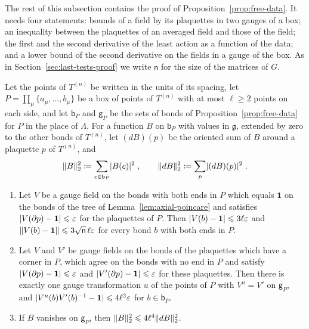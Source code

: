 \documentclass[11pt]{preprint}
\newcommand{\id}{\mathbf 1}
\DeclarePairedDelimiter{\abs}{\lvert}{\rvert}
\DeclarePairedDelimiter{\norm}{\lVert}{\rVert}
\numberwithin{equation}{section}
\begin{document}
The rest of this subsection contains the proof of Proposition~\ref{prop:free-data}. It needs four statements: bounds of a field by its plaquettes in two gauges of a box; an inequality between the plaquettes of an averaged field and those of the field; the first and the second derivative of the least action as a function of the data; and a lower bound of the second derivative on the fields in a gauge of the box. As in Section~\ref{sec:last-tests-proof} we write $\mathsf n$ for the size of the matrices of $G$.

\begin{lemma}\label{lem:box-gauges}
Let the points of $T^{(n)}$ be written in the units of its spacing, let $P = \prod_\mu\{ a_\mu, \dots, b_\mu \}$ be a box of points of $T^{(n)}$ with at most $\ell \geqslant 2$ points on each side, and let $\mathsf b_P$ and $\mathsf g_P$ be the sets of bonds of Proposition~\ref{prop:free-data} for $P$ in the place of $\Lambda$. For a function $B$ on $\mathsf b_P$ with values in $\mathfrak g$, extended by zero to the other bonds of $T^{(n)}$, let $(dB)(p)$ be the oriented sum of $B$ around a plaquette $p$ of $T^{(n)}$, and
\begin{equation}\label{eq:box-norms}
    \norm B_2^2 \coloneqq \sum_{c \in \mathsf b_P}\abs{B(c)}^2\;,
    \qquad
    \norm{dB}_2^2 \coloneqq \sum_p\abs{(dB)(p)}^2\;.
\end{equation}
\begin{enumerate}[label=(\roman*)]
\item Let $V$ be a gauge field on the bonds with both ends in $P$ which equals $\id$ on the bonds of the tree of Lemma~\ref{lem:axial-poincare} and satisfies $\abs{V(\partial p) - \id} \leqslant \varepsilon$ for the plaquettes of $P$. Then $\abs{V(b) - \id} \leqslant 3\ell\varepsilon$ and $\norm{V(b) - \id} \leqslant 3\sqrt{\mathsf n}\,\ell\varepsilon$ for every bond $b$ with both ends in $P$.
\item Let $V$ and $V'$ be gauge fields on the bonds of the plaquettes which have a corner in $P$, which agree on the bonds with no end in $P$ and satisfy $\abs{V(\partial p) - \id} \leqslant \varepsilon$ and $\abs{V'(\partial p) - \id} \leqslant \varepsilon$ for these plaquettes. Then there is exactly one gauge transformation $u$ of the points of $P$ with $V^u = V'$ on $\mathsf g_P$, and $\abs{V^u(b)V'(b)^{-1} - \id} \leqslant 4\ell^2\varepsilon$ for $b \in \mathsf b_P$.
\item If $B$ vanishes on $\mathsf g_P$, then $\norm B_2^2 \leqslant 4\ell^4\norm{dB}_2^2$.
\end{enumerate}
\end{lemma}
\end{document}

